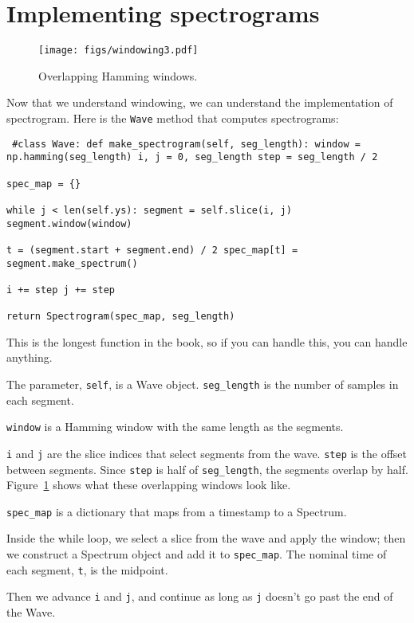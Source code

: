 \documentclass[12pt]{book} \usepackage[width=5.5in,height=8.5in, hmarginratio=3:2,vmarginratio=1:1]{geometry}
\begin{document}
\section{Implementing spectrograms} 

\begin{figure} 

\centerline{\texttt{[image: figs/windowing3.pdf]}} \caption{Overlapping Hamming windows.} \label{fig.windowing3} \end{figure} 

Now that we understand windowing, we can understand the implementation of spectrogram. Here is the {\tt Wave} method that computes spectrograms: 

\begin{verbatim} #class Wave: def make_spectrogram(self, seg_length): window = np.hamming(seg_length) i, j = 0, seg_length step = seg_length / 2 

spec_map = {} 

while j < len(self.ys): segment = self.slice(i, j) segment.window(window) 

t = (segment.start + segment.end) / 2 spec_map[t] = segment.make_spectrum() 

i += step j += step 

return Spectrogram(spec_map, seg_length) \end{verbatim} 

This is the longest function in the book, so if you can handle this, you can handle anything. 

The parameter, {\tt self}, is a Wave object. \verb"seg_length" is the number of samples in each segment. 

{\tt window} is a Hamming window with the same length as the segments. 

{\tt i} and {\tt j} are the slice indices that select segments from the wave. {\tt step} is the offset between segments. Since {\tt step} is half of \verb"seg_length", the segments overlap by half. Figure~\ref{fig.windowing3} shows what these overlapping windows look like. 

\verb"spec_map" is a dictionary that maps from a timestamp to a Spectrum. 

Inside the while loop, we select a slice from the wave and apply the window; then we construct a Spectrum object and add it to \verb"spec_map". The nominal time of each segment, {\tt t}, is the midpoint. 

Then we advance {\tt i} and {\tt j}, and continue as long as {\tt j} doesn't go past the end of the Wave. 
\end{document}
